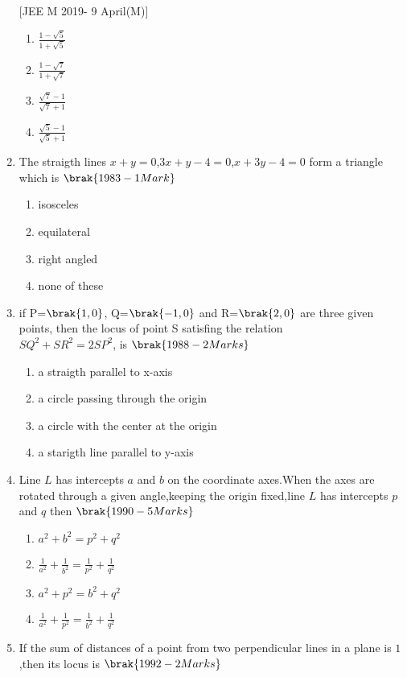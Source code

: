 \begin{enumerate}
\hfill{[JEE M 2019- 9 April(M)]}
\begin{multicols}{2}
\begin{enumerate}
\item $\frac{1-\sqrt{5}}{1+\sqrt{5}}$
\item $\frac{1-\sqrt{7}}{1+\sqrt{7}}$
\item $\frac{\sqrt{7}-1}{\sqrt{7}+1}$
\item $\frac{\sqrt{5}-1}{\sqrt{5}+1}$
\end{enumerate}
\end{multicols}
\item The straigth lines $x+y=0$,$3x+y-4=0$,$x+3y-4=0$ form a triangle which is \hfill{$\brak{1983-1 Mark}$}
\begin{enumerate}   
     \item isosceles
     \item equilateral
     \item right angled
     \item none of these
\end{enumerate}
\item if P=$\brak{1,0}$, Q=$\brak{-1,0}$ and R=$\brak{2,0}$ are three given points, then the locus of point S satisfing the relation\\$SQ^2+SR^2=2SP^2$, is 
\hfill{$\brak{1988-2 Marks}$}
\begin{enumerate}
    \item a straigth parallel to x-axis
    \item a circle passing through the origin
    \item a circle with the center at the origin 
    \item a starigth line parallel to y-axis 
\end{enumerate}
\item Line $L$ has intercepts $a$ and $b$ on the coordinate axes.When the axes are rotated through a given angle,keeping the origin fixed,line $L$ has intercepts $p$ and $q$ then
\hfill{$\brak{1990-5 Marks}$}
\begin{enumerate}
    
    \item $a^2+b^2=p^2+q^2$
    \item $\frac{1}{a^2}+\frac{1}{b^2}=\frac{1}{p^2}+\frac{1}{q^2}$
    \item $a^2+p^2=b^2+q^2$
    \item $\frac{1}{a^2}+\frac{1}{p^2}=\frac{1}{b^2}+\frac{1}{q^2}$
    
\end{enumerate}
\item If the sum of distances of a point from two perpendicular lines in a plane is $1$,then its locus is
\hfill{$\brak{1992-2 Marks}$}
\begin{enumerate}
    

\end{enumerate}
\end{enumerate}
